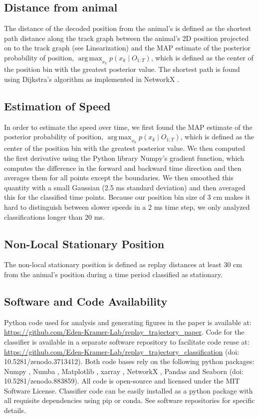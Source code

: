 \documentclass[times, twoside]{zHenriquesLab-StyleBioRxiv}
\DeclareMathOperator*{\argmax}{arg\,max}
\begin{document}
\subsection*{Distance from animal}
The distance of the decoded position from the animal's is defined as the shortest path distance along the track graph between the animal's 2D position projected on to the track graph (see Linearization) and the MAP estimate of the posterior probability of position, $\argmax_{x_k} p(x_{k} \mid O_{1:T})$, which is defined as the center of the position bin with the greatest posterior value. The shortest path is found using Dijkstra's algorithm \cite{Dijkstranotetwoproblems1959} as implemented in NetworkX \cite{HagbergExploringNetworkStructure2008}.

\subsection*{Estimation of Speed}
In order to estimate the speed over time, we first found the MAP estimate of the posterior probability of position, $\argmax_{x_k} p(x_{k} \mid O_{1:T})$, which is defined as the center of the position bin with the greatest posterior value. We then computed the first derivative using the Python library Numpy's gradient function, which computes the difference in the forward and backward time direction and then averages them for all points except the boundaries. We then smoothed this quantity with a small Gaussian (2.5 ms standard deviation) and then averaged this for the classified time points. Because our position bin size of 3 cm makes it hard to distinguish between slower speeds in a 2 ms time step, we only analyzed classifications longer than 20 ms.

\subsection*{Non-Local Stationary Position}
The non-local stationary position is defined as replay distances at least 30 cm from the animal's position during a time period classified as stationary.

\subsection*{Software and Code Availability}
Python code used for analysis and generating figures in the paper is available at: \url{https://github.com/Eden-Kramer-Lab/replay_trajectory_paper}. Code for the classifier is available in a separate software repository to facilitate code reuse at: \url{https://github.com/Eden-Kramer-Lab/replay_trajectory_classification} (doi: 10.5281/zenodo.3713412).
Both code bases rely on the following python packages: Numpy \cite{vanderWaltNumPyArrayStructure2011}, Numba \cite{LamNumbaLLVMbasedPython2015}, Matplotlib \cite{HunterMatplotlib2DGraphics2007}, xarray \cite{HoyerxarrayNDlabeled2017}, NetworkX \cite{HagbergExploringNetworkStructure2008}, Pandas \cite{McKinneyDataStructuresStatistical2010} and Seaborn (doi: 10.5281/zenodo.883859). All code is open-source and licensed under the MIT Software License. Classifier code can be easily installed as a python package with all requisite dependencies using pip or conda. See software repositories for specific details.
\end{document}
